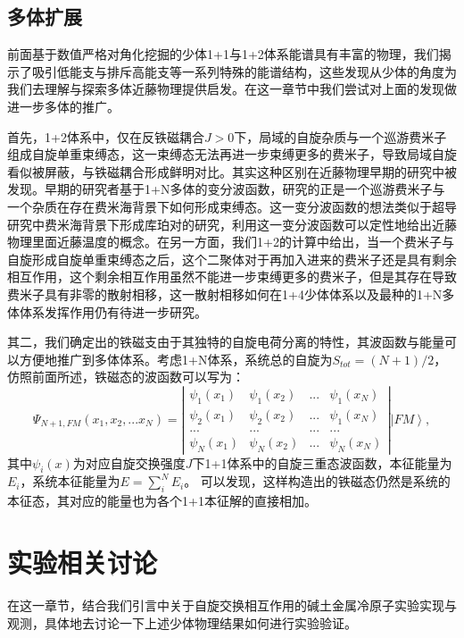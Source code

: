 \subsection{多体扩展}

前面基于数值严格对角化挖掘的少体1+1与1+2体系能谱具有丰富的物理，我们揭示了吸引低能支与排斥高能支等一系列特殊的能谱结构，这些发现从少体的角度为我们去理解与探索多体近藤物理提供启发。在这一章节中我们尝试对上面的发现做进一步多体的推广。

首先，1+2体系中，仅在反铁磁耦合$J>0$下，局域的自旋杂质与一个巡游费米子组成自旋单重束缚态，这一束缚态无法再进一步束缚更多的费米子，导致局域自旋看似被屏蔽，与铁磁耦合形成鲜明对比。其实这种区别在近藤物理早期的研究中被发现\cite{Yosida}。早期的研究者基于1+N多体的变分波函数，研究的正是一个巡游费米子与一个杂质在存在费米海背景下如何形成束缚态。这一变分波函数的想法类似于超导研究中费米海背景下形成库珀对的研究，利用这一变分波函数可以定性地给出近藤物理里面近藤温度的概念。在另一方面，我们1+2的计算中给出，当一个费米子与自旋形成自旋单重束缚态之后，这个二聚体对于再加入进来的费米子还是具有剩余相互作用，这个剩余相互作用虽然不能进一步束缚更多的费米子，但是其存在导致费米子具有非零的散射相移，这一散射相移如何在1+4少体体系以及最种的1+N多体体系发挥作用仍有待进一步研究。

其二，我们确定出的铁磁支由于其独特的自旋电荷分离的特性，其波函数与能量可以方便地推广到多体体系。考虑1+N体系，系统总的自旋为$S_{tot}=(N+1)/2$，仿照前面所述，铁磁态的波函数可以写为：
\begin{equation}
\Psi_{N+1,FM}(x_1,x_2,...x_N)=\left|\begin{array}{cccc}\psi_1(x_1) & \psi_1(x_2) & ... &\psi_1(x_N)  \\ \psi_2(x_1) & \psi_2(x_2) & ... &\psi_1(x_N) \\
... & ... & ... &... \\
\psi_N(x_1) & \psi_N(x_2) & ... &\psi_N(x_N)\end{array}\right| \left|FM\right>,
\end{equation}
其中$\psi_i(x)$为对应自旋交换强度$J$下1+1体系中的自旋三重态波函数，本征能量为$E_i$，系统本征能量为$E = \sum_i^N E_i$。
可以发现，这样构造出的铁磁态仍然是系统的本征态，其对应的能量也为各个1+1本征解的直接相加。

\section{实验相关讨论}
在这一章节，结合我们引言中关于自旋交换相互作用的碱土金属冷原子实验实现与观测，具体地去讨论一下上述少体物理结果如何进行实验验证。

